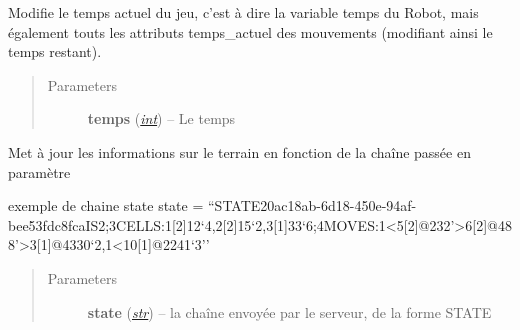 \documentclass[letterpaper,10pt,english]{sphinxmanual}
\begin{document}
\begin{fulllineitems}
\begin{fulllineitems}
\begin{quote}
\begin{description}
\end{description}\end{quote}

\end{fulllineitems}


\begin{fulllineitems}
\label{index:Robot.Robot.setTemps}
Modifie le temps actuel du jeu, c'est à dire la variable temps du Robot, 
mais également touts les attributs temps\_actuel des mouvements (modifiant ainsi le temps restant).
\begin{quote}\begin{description}
\item[{Parameters}] \leavevmode
\textbf{temps} (\href{http://docs.python.org/library/functions.html\#int}{\emph{int}}) -- Le temps

\end{description}\end{quote}

\end{fulllineitems}


\begin{fulllineitems}
\label{index:Robot.Robot.updateTerrain}
Met à jour les informations sur le terrain en fonction de la chaîne passée en paramètre

exemple de chaine state
state = ``STATE20ac18ab-6d18-450e-94af-bee53fdc8fcaIS2;3CELLS:1{[}2{]}12`4,2{[}2{]}15`2,3{[}1{]}33`6;4MOVES:1\textless{}5{[}2{]}@232'\textgreater{}6{[}2{]}@488'\textgreater{}3{[}1{]}@4330`2,1\textless{}10{[}1{]}@2241`3''
\begin{quote}\begin{description}
\item[{Parameters}] \leavevmode
\textbf{state} (\href{http://docs.python.org/library/functions.html\#str}{\emph{str}}) -- la chaîne envoyée par le serveur, de la forme STATE

\end{description}\end{quote}

\end{fulllineitems}


\end{fulllineitems}
\end{document}
